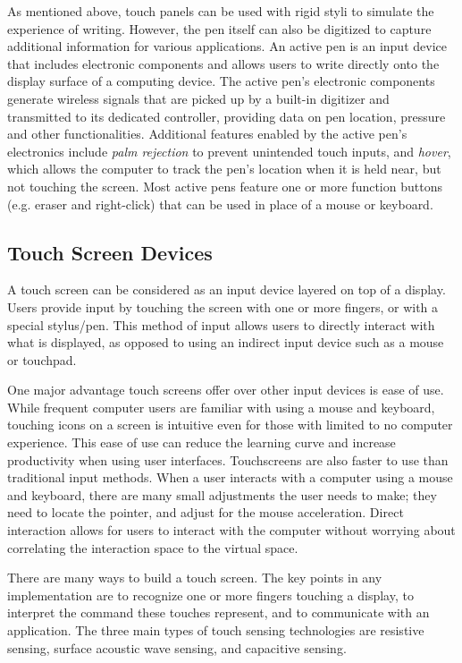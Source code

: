 As mentioned above, touch panels can be used with rigid styli to simulate the experience of writing. 
 However, the pen itself can also be digitized to capture additional information for various applications. 
 An active pen is an input device that includes electronic components and allows users to write directly onto the display surface of a computing device.
 The active pen's electronic components generate wireless signals that are picked up by a built-in digitizer and transmitted to its dedicated controller, providing data on pen location, pressure and other functionalities. 
 Additional features enabled by the active pen's electronics include \textit{palm rejection} to prevent unintended touch inputs, and \textit{hover}, which allows the computer to track the pen's location when it is held near, but not touching the screen. 
 Most active pens feature one or more function buttons (e.g. eraser and right-click) that can be used in place of a mouse or keyboard.

\subsection{Touch Screen Devices}

A touch screen can be considered as an input device layered on top of a display. 
Users provide input by touching the screen with one or more fingers, or with a special stylus/pen.
This method of input allows users to directly interact with what is displayed, as opposed to using an indirect input device such as a mouse or touchpad.

One major advantage touch screens offer over other input devices is ease of use.
While frequent computer users are familiar with using a mouse and keyboard, touching icons on a screen is intuitive even for those with limited to no computer experience.
This ease of use can reduce the learning curve and increase productivity when using user interfaces.
Touchscreens are also faster to use than traditional input methods.
When a user interacts with a computer using a mouse and keyboard, there are many small adjustments the user needs to make; they need to locate the pointer, and adjust for the mouse acceleration.
Direct interaction allows for users to interact with the computer without worrying about correlating the interaction space to the virtual space. 

There are many ways to build a touch screen.
The key points in any implementation are to recognize one or more fingers touching a display, to interpret the command these touches represent, and to communicate with an application.
The three main types of touch sensing technologies are resistive sensing, surface acoustic wave sensing, and capacitive sensing.

